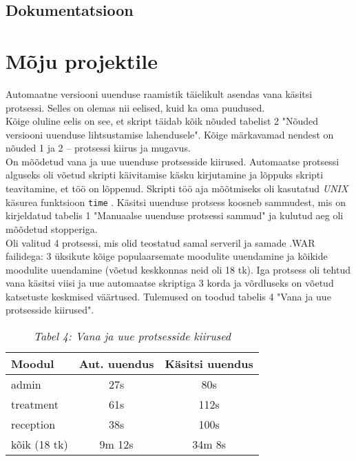 \documentclass[12pt]{report}
\newcommand{\code}[1]{\texttt{#1}}
\begin{document}
  \subsection{Dokumentatsioon}
  
  \newpage
  
  \section{Mõju projektile}
  
  Automaatne versiooni uuenduse raamistik täielikult asendas vana käsitsi protsessi. Selles on olemas nii eelised, kuid ka oma puudused.\\
  
  Kõige oluline eelis on see, et skript täidab kõik nõuded tabelist 2 "Nõuded versiooni uuenduse lihtsustamise lahendusele". Kõige märkavamad nendest on nõuded 1 ja 2 \--- protsessi kiirus ja mugavus.\\
  
  On mõõdetud vana ja uue uuenduse protsesside kiirused. Automaatse protsessi alguseks oli võetud skripti käivitamise käsku kirjutamine ja lõppuks skripti teavitamine, et töö on lõppenud. Skripti töö aja mõõtmiseks oli kasutatud \textit{UNIX} käsurea funktsioon \code{time} \cite{time}. Käsitsi uuenduse protsess koosneb sammudest, mis on kirjeldatud tabelis 1 "Manuaalse uuenduse protsessi sammud" ja kulutud aeg oli mõõdetud stopperiga.\\
  
  Oli valitud 4 protsessi, mis olid teostatud samal serveril ja samade .WAR failidega: 3 üksikute kõige populaarsemate moodulite uuendamine ja kõikide moodulite uuendamine (võetud keskkonnas neid oli 18 tk). Iga protsess oli tehtud vana käsitsi viisi ja uue automaatse skriptiga 3 korda ja võrdluseks on võetud katsetuste keskmised väärtused. Tulemused on toodud tabelis 4 "Vana ja uue protsesside kiirused".
  
  \begin{table}[!htbp]
    \begin{center}
      \begin{tabular}{| l | c | c |}
        \hline
         \textbf{Moodul} & \textbf{Aut. uuendus} & \textbf{Käsitsi uuendus}\\
        \hline
        admin & 27s & 80s\\
        treatment & 61s & 112s\\
        reception & 38s & 100s\\
        kõik (18 tk) & 9m 12s & 34m 8s\\
        \hline
      \end{tabular}
      \caption*{\textit{Tabel 4: Vana ja uue protsesside kiirused}}
    \end{center}
  \end{table}
  
\end{document}
